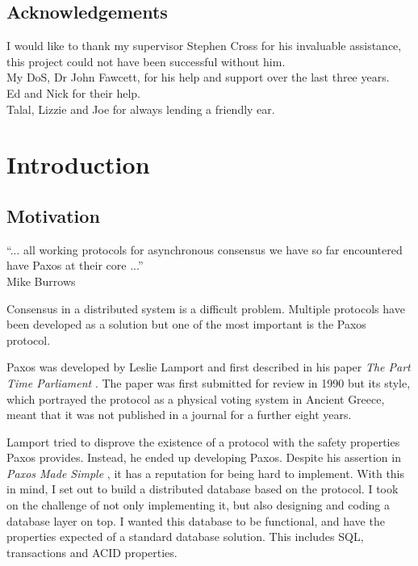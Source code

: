 \documentclass[12pt,twoside,notitlepage]{report}
\newenvironment{myquote}{\list{}{\leftmargin=0.3in\rightmargin=0.3in}\item[]}{\endlist}
\begin{document}
\tableofcontents

\listoffigures

\newpage
\section*{Acknowledgements}

I would like to thank my supervisor Stephen Cross for his invaluable assistance, this project
could not have been successful without him. \\
My DoS, Dr John Fawcett, for his help and support over the last three years. \\
Ed and Nick for their help. \\
Talal, Lizzie and Joe for always lending a friendly ear.


\cleardoublepage        %

\setcounter{page}{1}
\pagestyle{headings}

\chapter{Introduction}

\section{Motivation}

\begin{myquote}
``... all working protocols for asynchronous consensus we have so far encountered have Paxos at their
core ...'' \\
Mike Burrows \cite{burrows06}
\end{myquote}

Consensus in a distributed system is a difficult problem. Multiple protocols have been
developed as a solution but one of the most important is the Paxos protocol.

Paxos was developed by Leslie Lamport and first described in his paper \emph{The Part Time
Parliament} \cite{lamport98}.  The paper was first submitted for review in 1990 but its style,
which portrayed the protocol as a physical voting system in Ancient Greece, meant that it was not
published in a journal for a further eight years.

Lamport tried to disprove the existence of a protocol with the safety properties Paxos provides.
Instead, he ended up developing Paxos. Despite his assertion in \emph{Paxos Made Simple}
\cite{lamport01}, it has a reputation for being hard to implement.  With this in mind, I set out
to build a distributed database based on the protocol.  I took on the challenge of not only
implementing it, but also designing and coding a database layer on top. I wanted this database to
be functional, and have the properties expected of a standard database solution. This includes
SQL, transactions and ACID properties.
\end{document}
